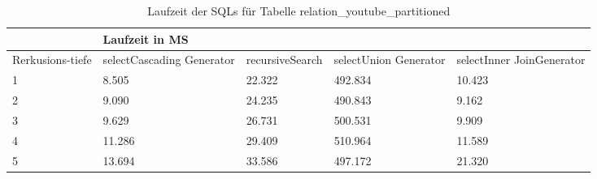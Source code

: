 \begin{table}[H]
	\centering
	\begin{tabular}{l|l|l|l|l|l|}
		\cline{2-6}
		& \multicolumn{5}{|l|}{Laufzeit in MS}                                                                                                                                                  \\ \hline
		\multicolumn{1}{|l|}{\multirow{2}{2cm}{Rerkusions-tiefe}} & \multicolumn{2}{|l|}{\multirow{2}{3cm}{selectCascading Generator}} & \multirow{2}{2.8cm}{recursiveSearch} & \multirow{2}{2.5cm}{selectUnion Generator} & \multirow{2}{2.5cm}{selectInner JoinGenerator} \\
		\multicolumn{1}{|l|}{}
		& \multicolumn{2}{|l|}{}                                           &                                  &                                     &                                           \\ \hline
		
		\multicolumn{1}{|l|}{1}                                 & \multicolumn{2}{l|}{8.505}                                       & 22.322                                                & 492.834                                                   & 10.423                                                          \\ \hline
		\multicolumn{1}{|l|}{2}                                 & \multicolumn{2}{l|}{9.090}                                       & 24.235                                                & 490.843                                                   & 9.162                                                           \\ \hline
		\multicolumn{1}{|l|}{3}                                 & \multicolumn{2}{l|}{9.629}                                       & 26.731                                                & 500.531                                                   & 9.909                                                           \\ \hline
		\multicolumn{1}{|l|}{4}                                 & \multicolumn{2}{l|}{11.286}                                      & 29.409                                                & 510.964                                                   & 11.589                                                          \\ \hline
		\multicolumn{1}{|l|}{5}                                 & \multicolumn{2}{l|}{13.694}                                      & 33.586                                                & 497.172                                                   & 21.320                                                          \\ \hline
		
	\end{tabular}
	\caption{Laufzeit der SQLs für Tabelle relation\_youtube\_partitioned}
\end{table}

